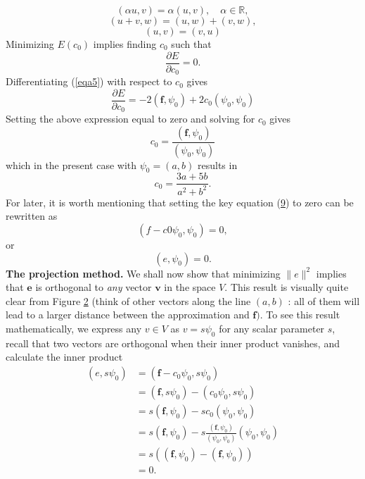 \documentclass[../main.tex]{subfiles}
\begin{document}
	\begin{equation}\label{eqa6}
		(\alpha u, v)=\alpha(u, v), \quad \alpha \in \mathbb{R},
	\end{equation}
	\begin{equation}\label{eqa7}
		(u + v, w)=(u, w)+(v, w),
	\end{equation}
	\begin{equation}\label{eqa8}
		(u, v)= (v, u)
	\end{equation}
	\indent Minimizing $E\left(c_{0}\right)$ implies finding $c_{0}$ such that
	$$
	\frac{\partial E}{\partial c_{0}}=0.
	$$
	Differentiating (\ref{eqa5}) with respect to $c_{0}$ gives
	\begin{equation}\label{eqa9}
		\frac{\partial E}{\partial c_{0}}=-2\left(\boldsymbol{f}, \psi_{0}\right)+2 c_{0}\left(\psi_{0}, \psi_{0}\right)
	\end{equation}
	Setting the above expression equal to zero and solving for $c_{0}$ gives
	\begin{equation}\label{eqa10}
		c_{0}=\frac{\left(\boldsymbol{f}, \psi_{0}\right)}{\left(\psi_{0}, \psi_{0}\right)}
	\end{equation}
	which in the present case with $\psi_{0}=(a, b)$ results in
	\begin{equation}\label{eqa11}
		c_{0}=\frac{3 a+5 b}{a^{2}+b^{2}}.
	\end{equation}
	For later, it is worth mentioning that setting the key equation (\hyperref[eqa9]{9}) to zero can be rewritten as
	$$
	\left(f-c 0 \psi_{0}, \psi_{0}\right)=0,
	$$
	or
	\begin{equation}\label{eqa12}
		\left(e, \psi_{0}\right)=0.
	\end{equation}
	\textbf{The projection method.} We shall now show that minimizing $\|e\|^{2}$ implies that $\boldsymbol{e}$ is orthogonal to \textit{any} vector $\boldsymbol{v}$ in the space $V$. This result is visually quite clear from Figure \hyperref[fig:img_2]{2} (think of other vectors along the line $(a, b)$ : all of them will lead to a larger distance between the approximation and $\boldsymbol{f})$. To see this result mathematically, we express any $v \in V$ as $v=s \psi_{0}$ for any scalar parameter $s$, recall that two vectors are orthogonal when their inner product vanishes, and calculate the inner product
	$$
	\begin{aligned}
		\left(e, s \psi_{0}\right) &=\left(\boldsymbol{f}-c_{0} \psi_{0}, s \psi_{0}\right) \\
		&=\left(\boldsymbol{f}, s \psi_{0}\right)-\left(c_{0} \psi_{0}, s \psi_{0}\right) \\
		&=s\left(\boldsymbol{f}, \psi_{0}\right)-s c_{0}\left(\psi_{0}, \psi_{0}\right) \\
		&=s\left(\boldsymbol{f}, \psi_{0}\right)-s \frac{\left(\boldsymbol{f}, \psi_{0}\right)}{\left(\psi_{0}, \psi_{0}\right)}\left(\psi_{0}, \psi_{0}\right) \\
		&=s\left(\left(\boldsymbol{f}, \psi_{0}\right)-\left(\boldsymbol{f}, \psi_{0}\right)\right) \\
		&=0 .
	\end{aligned}
	$$
\end{document}
